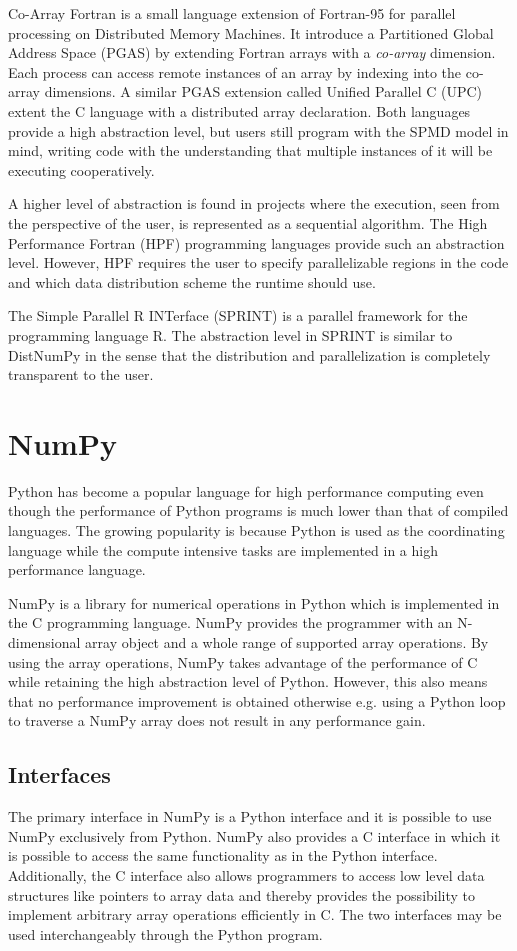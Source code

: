 \documentclass{sigplanconf}
\begin{document}
Co-Array Fortran\cite{Co-arrayFortran98} is a  small language extension of Fortran-95 for parallel processing on Distributed Memory Machines. It introduce a Partitioned Global Address Space (PGAS) by extending Fortran arrays with a \emph{co-array} dimension. Each process can access remote instances of an array by indexing into the co-array dimensions. A similar PGAS extension called Unified Parallel C (UPC)\cite{Carlson99_UPC} extent the C language with a distributed array declaration. Both languages provide a high abstraction level, but users still program with the SPMD model in mind, writing code with the understanding that multiple instances of it will be executing cooperatively.

A higher level of abstraction is found in projects where the execution, seen from the perspective of the user, is represented as a sequential algorithm. The High Performance Fortran (HPF)\cite{Loveman93} programming languages provide such an abstraction level. However, HPF requires the user to specify parallelizable regions in the code and which data distribution scheme the runtime should use.

The Simple Parallel R INTerface (SPRINT)\cite{Hill08} is a parallel framework for the programming language R. The abstraction level in SPRINT is similar to DistNumPy in the sense that the distribution and parallelization is completely transparent to the user.

\section{NumPy}
Python has become a popular language for high performance computing even though the performance of Python programs is much lower than that of compiled languages. The growing popularity is because Python is used as the coordinating language while the compute intensive tasks are implemented in a high performance language.

NumPy\cite{numpy} is a library for numerical operations in Python which is implemented in the C programming language. NumPy provides the programmer with an N-dimensional array object and a whole range of supported array operations. By using the array operations, NumPy takes advantage of the performance of C while retaining the high abstraction level of Python. However, this also means that no performance improvement is obtained otherwise e.g. using a Python loop to traverse a NumPy array does not result in any performance gain. 

\subsection{Interfaces}
The primary interface in NumPy is a Python interface and it is possible to use NumPy exclusively from Python. NumPy also provides a C interface in which it is possible to access the same functionality as in the Python interface. Additionally, the C interface also allows programmers to access low level data structures like pointers to array data and thereby provides the possibility to implement arbitrary array operations efficiently in C. The two interfaces may be used interchangeably through the Python program.
\end{document}

